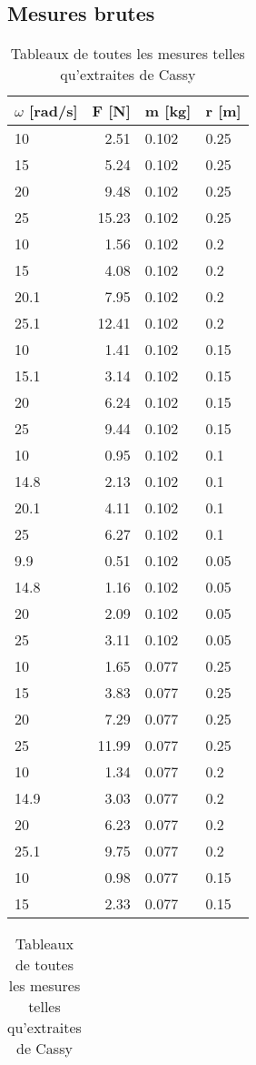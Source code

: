 \subsection{Mesures brutes}
\begin{table}[ht]
    \caption[Mesures brutes]{Tableaux de toutes les mesures telles qu'extraites de Cassy}
    \centering
    \begin{tabular}{|l|r|l|l|}
	\hline
	$\omega$ [rad/s] &F [N]	&m [kg]	&r [m]\\
	\hline
	10	&2.51	&0.102	&0.25 \\
	15	&5.24	&0.102	&0.25 \\
	20	&9.48	&0.102	&0.25 \\
	25	&15.23	&0.102	&0.25 \\
	10	&1.56	&0.102	&0.2  \\
	15	&4.08	&0.102	&0.2  \\
	20.1	&7.95	&0.102	&0.2  \\
	25.1	&12.41	&0.102	&0.2  \\
	10	&1.41	&0.102	&0.15 \\
	15.1	&3.14	&0.102	&0.15 \\
	20	&6.24	&0.102	&0.15 \\
	25	&9.44	&0.102	&0.15 \\
	10	&0.95	&0.102	&0.1  \\
	14.8	&2.13	&0.102	&0.1  \\
	20.1	&4.11	&0.102	&0.1  \\
	25	&6.27	&0.102	&0.1  \\
	9.9	&0.51	&0.102	&0.05 \\
	14.8	&1.16	&0.102	&0.05 \\
	20	&2.09	&0.102	&0.05 \\
	25	&3.11	&0.102	&0.05 \\
	10	&1.65	&0.077	&0.25 \\
	15	&3.83	&0.077	&0.25 \\
	20	&7.29	&0.077	&0.25 \\
	25	&11.99	&0.077	&0.25 \\
	10	&1.34	&0.077	&0.2  \\
	14.9	&3.03	&0.077	&0.2  \\
	20	&6.23	&0.077	&0.2  \\
	25.1	&9.75	&0.077	&0.2  \\
	10	&0.98	&0.077	&0.15 \\
	15	&2.33	&0.077	&0.15 \\
	\hline
    \end{tabular}
    \quad
    \begin{tabular}{|l|r|l|l|}

\end{tabular}
\end{table}
